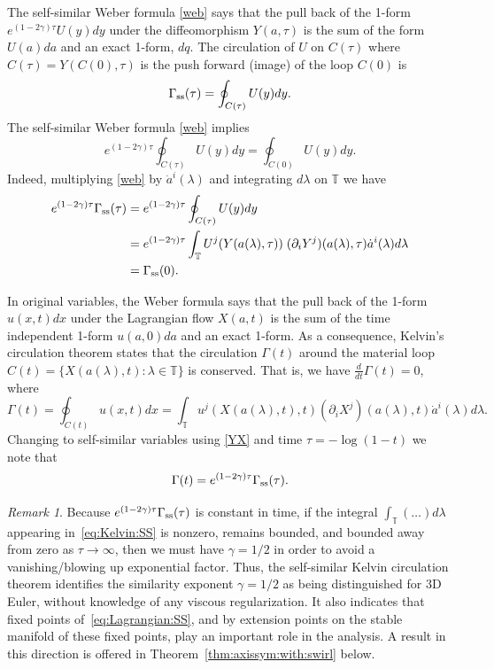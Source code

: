 \documentclass[11pt,reqno]{amsproc}
\numberwithin{equation}{section}
\theoremstyle{remark}
\newtheorem{remark}[theorem]{Remark}
\newcommand{\la}{\label}
\newcommand{\be}{\begin{equation}}
\newcommand{\ee}{\end{equation}}
\begin{document}
{The self-similar Weber formula \eqref{web}  says that the pull back of the 1-form $e^{(1-2\gamma)\tau}U(y)dy$ under the diffeomorphism $Y(a,\tau)$ is the sum of the form $U(a)da$ and an exact 1-form, $dq$. The circulation of $U$ on $C(\tau)$ where $C(\tau) = Y(C(0),\tau)$ is  the  push forward (image) of the loop $C(0)$ is
\be
\Gamma_{\rm{ss}}(\tau) = \oint_{C(\tau)} U(y)dy.
\la{circss}
\ee
The self-similar Weber formula \eqref{web} implies
\be
e^{(1-2\gamma)\tau}\oint_{C(\tau)} U(y)dy = \oint_{C(0)} U(y)dy.
\la{circinv}
\ee
Indeed, multiplying \eqref{web} by $\dot{a}^i(\lambda)$ and integrating $d\lambda$ on $\mathbb T$  we have
\begin{align}
e^{(1-2\gamma)\tau}\Gamma_{\rm{ss}}(\tau) 
&= e^{(1-2\gamma)\tau}\oint_{C(\tau)}U(y)dy \notag\\
&= e^{(1-2\gamma)\tau}\int_{\mathbb{T}}  U^j(Y(a(\lambda),\tau)) \; (\partial_{i}Y^j)(a(\lambda),\tau)  \dot{a}^i(\lambda) d \lambda
\notag \\
&= \Gamma_{\rm{ss}}(0).
\label{eq:Kelvin:SS}
\end{align}

In original variables, the Weber formula  says that the pull back  of the 1-form $u(x,t)dx$ under the Lagrangian flow $X(a,t)$ is the sum of the time independent 1-form $u(a,0)da$ and an exact 1-form.  As a consequence, Kelvin's circulation theorem states that the circulation $\Gamma(t)$ around the material loop $C(t) = \{ X(a(\lambda),t) \colon \lambda \in \mathbb{T}\}$ is conserved. 
That is, we  have $\frac{d}{dt} \Gamma(t) = 0$, where 
\begin{equation*}
\Gamma(t) 
= \oint_{C(t)} u(x,t)dx
= \int_{\mathbb{T}} u^j(X(a(\lambda),t),t) (\partial_{i}X^j)(a(\lambda),t)  \dot{a}^i(\lambda) d \lambda .
\end{equation*}
Changing  to self-similar variables using \eqref{YX}  and time $\tau=-\log(1-t)$ we note that 
\[
\Gamma(t) = e^{(1-2\gamma)\tau}\Gamma_{\rm ss}(\tau)
.
\]





\begin{remark}
Because $e^{(1-2\gamma)\tau}\Gamma_{\rm ss}(\tau)$ is constant in time, if the integral $\int_{\mathbb{T}} (\ldots) d\lambda$ appearing in~\eqref{eq:Kelvin:SS} is nonzero, remains bounded, and  bounded away from zero as $\tau \to \infty$, then we must have $\gamma = 1/2$ in order to avoid a vanishing/blowing up exponential factor. Thus, the self-similar Kelvin circulation theorem identifies the similarity exponent $\gamma=1/2$ as being distinguished for 3D Euler, without knowledge of any viscous regularization. It also indicates that fixed points of~\eqref{eq:Lagrangian:SS}, and by extension points on the stable manifold of these fixed points, play an important role in the analysis. A result in this direction is offered in Theorem~\ref{thm:axissym:with:swirl} below.
\end{remark}

}
\end{document}

